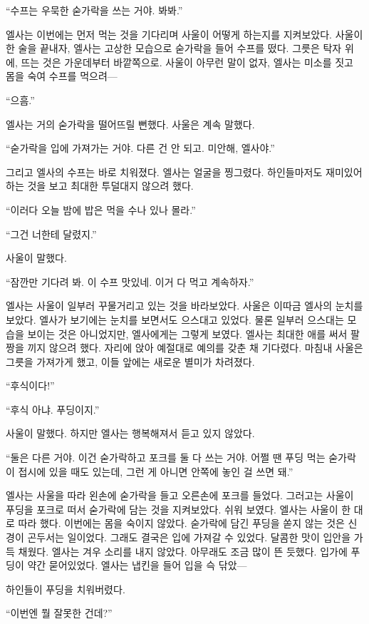 ``수프는 우묵한 숟가락을 쓰는 거야. 봐봐.''

엘사는 이번에는 먼저 먹는 것을 기다리며 사울이 어떻게 하는지를 지켜보았다. 사울이 한 술을 끝내자, 엘사는 고상한 모습으로 숟가락을 들어 수프를 떴다. 그릇은 탁자 위에, 뜨는 것은 가운데부터 바깥쪽으로. 사울이 아무런 말이 없자, 엘사는 미소를 짓고 몸을 숙여 수프를 먹으려—

``으흠.''

엘사는 거의 숟가락을 떨어뜨릴 뻔했다. 사울은 계속 말했다.

``숟가락을 입에 가져가는 거야. 다른 건 안 되고. 미안해, 엘사야.''

그리고 엘사의 수프는 바로 치워졌다. 엘사는 얼굴을 찡그렸다. 하인들마저도 재미있어하는 것을 보고 최대한 투덜대지 않으려 했다.

``이러다 오늘 밤에 밥은 먹을 수나 있나 몰라.''

``그건 너한테 달렸지.''

사울이 말했다.

``잠깐만 기다려 봐. 이 수프 맛있네. 이거 다 먹고 계속하자.''

엘사는 사울이 일부러 꾸물거리고 있는 것을 바라보았다. 사울은 이따금 엘사의 눈치를 보았다. 엘사가 보기에는 눈치를 보면서도 으스대고 있었다. 물론 일부러 으스대는 모습을 보이는 것은 아니었지만, 엘사에게는 그렇게 보였다. 엘사는 최대한 애를 써서 팔짱을 끼지 않으려 했다. 자리에 앉아 예절대로 예의를 갖춘 채 기다렸다. 마침내 사울은 그릇을 가져가게 했고, 이들 앞에는 새로운 별미가 차려졌다.

``후식이다!''

``후식 아냐. 푸딩이지.''

사울이 말했다. 하지만 엘사는 행복해져서 듣고 있지 않았다.

``둘은 다른 거야. 이건 숟가락하고 포크를 둘 다 쓰는 거야. 어쩔 땐 푸딩 먹는 숟가락이 접시에 있을 때도 있는데, 그런 게 아니면 안쪽에 놓인 걸 쓰면 돼.''

엘사는 사울을 따라 왼손에 숟가락을 들고 오른손에 포크를 들었다. 그러고는 사울이 푸딩을 포크로 떠서 숟가락에 담는 것을 지켜보았다. 쉬워 보였다. 엘사는 사울이 한 대로 따라 했다. 이번에는 몸을 숙이지 않았다. 숟가락에 담긴 푸딩을 쏟지 않는 것은 신경이 곤두서는 일이었다. 그래도 결국은 입에 가져갈 수 있었다. 달콤한 맛이 입안을 가득 채웠다. 엘사는 겨우 소리를 내지 않았다. 아무래도 조금 많이 뜬 듯했다. 입가에 푸딩이 약간 묻어있었다. 엘사는 냅킨을 들어 입을 슥 닦았—

하인들이 푸딩을 치워버렸다.

``이번엔 뭘 잘못한 건데?''


